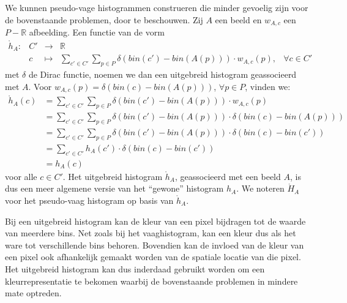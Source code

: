We kunnen pseudo-vage histogrammen construeren die minder gevoelig zijn voor de bovenstaande problemen,
door  te beschouwen. 
Zij $A$ een beeld en $w_{A,c}$ een $P - \mathbb{R}$ afbeelding. Een functie van de vorm
\begin{displaymath}
\begin{array}{rrcll}
\mathring{h}_A: 
 & C' & \to & \mathbb{R} \\
 & c  & \mapsto & \displaystyle\sum_{c' \in C'} \sum_{p \in P} \delta (bin(c')-bin(A(p))) \cdot w_{A,c}(p), & 
 \forall c \in C'
\end{array}
\end{displaymath}
met $\delta$ de Dirac functie, noemen we dan een uitgebreid histogram geassocieerd met $A$. 
Voor $w_{A,c}(p)=\delta(bin(c)-bin(A(p)))$, $\forall p \in P$, vinden we:
\begin{align*}
\mathring{h}_A(c) 
 &= \displaystyle \sum_{c' \in C'} \sum_{p \in P} \delta (bin(c')-bin(A(p))) \cdot w_{A,c}(p) \\
 &= \displaystyle \sum_{c' \in C'} \sum_{p \in P} \delta (bin(c')-bin(A(p))) \cdot \delta (bin(c)-bin(A(p))) \\
 &= \displaystyle \sum_{c' \in C'} \sum_{p \in P} \delta (bin(c')-bin(A(p))) \cdot \delta (bin(c)-bin(c')) \\
 &= \displaystyle \sum_{c' \in C'} h_A(c') \cdot \delta (bin(c)-bin(c')) \\
 &= h_A(c)
\end{align*}
voor alle $c \in C'$. Het uitgebreid histogram $\mathring{h}_A$, geassocieerd met een beeld $A$, is 
dus een meer algemene versie van het ``gewone'' histogram $h_A$. We noteren $\mathring{H}_A$ voor het 
pseudo-vaag histogram op basis van $\mathring{h}_A$.

Bij een uitgebreid histogram kan de kleur van een pixel bijdragen tot de waarde van meerdere
bins. Net zoals bij het vaaghistogram, kan een kleur dus als het ware tot verschillende 
bins behoren. Bovendien kan de invloed van de kleur van een pixel ook afhankelijk gemaakt worden
van de spatiale locatie van die pixel. Het uitgebreid histogram kan dus inderdaad gebruikt
worden om een kleurrepresentatie te bekomen waarbij de bovenstaande problemen in mindere mate
optreden.


